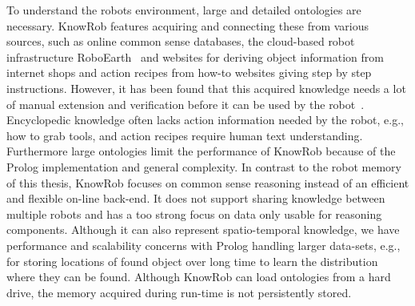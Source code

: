 To understand the robots environment, large and detailed ontologies
are necessary. KnowRob features acquiring and connecting these from
various sources, such as online common sense databases, the
cloud-based robot infrastructure RoboEarth~\cite{roboearth} and
websites for deriving object information from internet shops and
action recipes from how-to websites giving step by step instructions.
However, it has been found that this acquired knowledge needs a lot of
manual extension and verification before it can be used by the
robot~\cite{KnowRob-Web}. Encyclopedic knowledge often lacks action
information needed by the robot, e.g., how to grab tools, and
action recipes require human text understanding.
Furthermore large ontologies limit the performance of KnowRob because
of the Prolog implementation and general complexity. In contrast to
the robot memory of this thesis, KnowRob focuses on common
sense reasoning instead of an efficient and flexible on-line
back-end. It does not support sharing knowledge between multiple
robots and has a too strong focus on data only usable for reasoning
components. Although it can also represent spatio-temporal knowledge,
we have performance and scalability concerns with Prolog handling
larger data-sets, e.g., for storing locations of found object over long
time to learn the distribution where they can be found. Although
KnowRob can load ontologies from a hard drive, the memory acquired
during run-time is not persistently stored.

